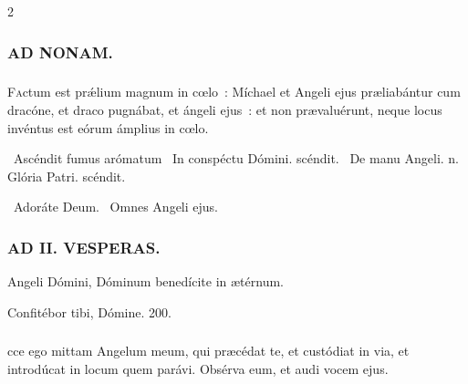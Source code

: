 \documentclass[9pt,twoside]{extarticle}
\begin{document}
\begin{multicols}{2}
{\subsubsection*{\center \textsc{AD NONAM.}}
\subsubsection*{}
\lettrine{F}actum est prǽlium magnum in cœlo~: Míchael et Angeli ejus præliabántur cum dracóne, et draco pugnábat, et ángeli ejus~: et non prævaluérunt, neque locus invéntus est eórum ámplius in cœlo.

\begin{tightlist}{}
\item {}~Ascéndit fumus arómatum \textred{*}~In conspéctu Dómini. scéndit. ~De manu Angeli. n. Glória Patri. scéndit.
\item {}~Adoráte Deum. ~Omnes Angeli ejus.
\end{tightlist}

\subsubsection*{\center \textsc{AD II. VESPERAS.}}
\begin{tightlist}{}
\item {} Angeli Dómini, Dóminum benedícite in ætérnum. 
\item {} Confitébor tibi, Dómine. 200.
\end{tightlist}

\subsubsection*{}
cce ego mittam Angelum meum, qui præcédat te, et custódiat in via, et introdúcat in locum quem parávi. Obsérva eum, et audi vocem ejus.

}
\end{multicols}
\end{document}
